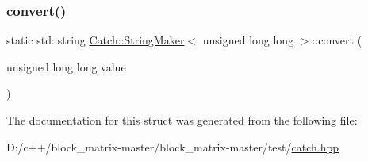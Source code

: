 \subsubsection{\texorpdfstring{convert()}{convert()}}
{\footnotesize\ttfamily static std\+::string \mbox{\hyperlink{struct_catch_1_1_string_maker}{Catch\+::\+String\+Maker}}$<$ unsigned long long $>$\+::convert (\begin{DoxyParamCaption}\item[{unsigned long long}]{value }\end{DoxyParamCaption})\hspace{0.3cm}{\ttfamily [static]}}



The documentation for this struct was generated from the following file\+:\begin{DoxyCompactItemize}
\item 
D\+:/c++/block\+\_\+matrix-\/master/block\+\_\+matrix-\/master/test/\mbox{\hyperlink{catch_8hpp}{catch.\+hpp}}\end{DoxyCompactItemize}

